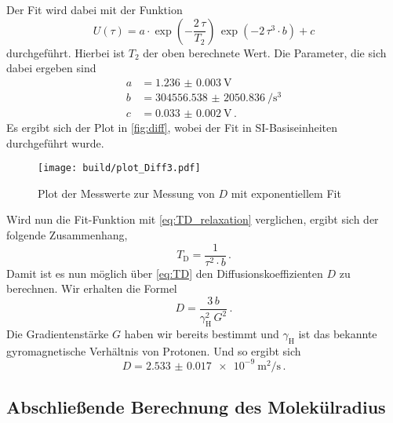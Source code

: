 Der Fit wird dabei mit der Funktion 
\begin{equation}
    U(\tau) = a \cdot \exp\left(-\frac{2 \, \tau}{T_2}\right) \, \exp\left(- 2 \, \tau ^3 \cdot b\right) + c 
    \label{eq:fit_d}
\end{equation}
durchgeführt.
Hierbei ist $T_2$ der oben berechnete Wert.
Die Parameter, die sich dabei ergeben sind 
\begin{align*}
    a &= \SI{1.236(3)}{\volt} \\
    b &= \SI{304556.538(2050836)}{\per\cubic\second} \\
    c &= \SI{0.033(2)}{\volt} \, .
\end{align*}
Es ergibt sich der Plot in \autoref{fig:diff}, wobei der Fit in SI-Basiseinheiten durchgeführt wurde.
\begin{figure}
    \centering
    \texttt{[image: build/plot\_Diff3.pdf]}
    \caption{Plot der Messwerte zur Messung von $D$ mit exponentiellem Fit}
    \label{fig:diff}
\end{figure}

Wird nun die Fit-Funktion mit \autoref{eq:TD_relaxation} verglichen, ergibt sich der folgende Zusammenhang,
\begin{equation}
    T_\text{D} = \frac{1}{\tau ^2 \cdot b} \, . 
    \label{eq:b_td}
\end{equation}
Damit ist es nun möglich über \autoref{eq:TD} den Diffusionskoeffizienten $D$ zu berechnen.
Wir erhalten die Formel 
\begin{equation}
    D = \frac{3 \, b}{\gamma _\text{H}^2 \, G^2 } \, . 
    \label{eq:diffusion}
\end{equation}
Die Gradientenstärke $G$ haben wir bereits bestimmt und $\gamma _\text{H}$ ist das bekannte gyromagnetische Verhältnis von Protonen.
Und so ergibt sich 
\begin{equation*}
    D = \SI{2.533(17)e-9}{\meter\squared\per\second} \, . 
    \label{eq:diffusion_wert}
\end{equation*}

\subsection{Abschließende Berechnung des Molekülradius}
\label{ssec:aus4}

